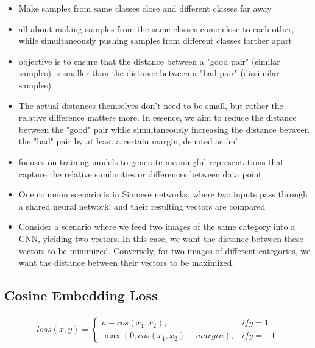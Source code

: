 \documentclass[11pt]{article}
\begin{document}
\begin{itemize}
    \item Make samples from same classes close and different classes far away
    \item all about making samples from the same classes
    come close to each other, while simultaneously pushing samples from different
    classes farther apart
    \item objective is to ensure that the distance between a
    "good pair" (similar samples) is smaller than the distance between a "bad pair"
    (dissimilar samples).
    \item The actual
    distances themselves don't need to be small, but rather the relative difference
    matters more. In essence, we aim to reduce the distance between the "good" pair
    while simultaneously increasing the distance between the "bad" pair by at least a
    certain margin, denoted as 'm'
    \item  focuses on
    training models to generate meaningful representations that capture the relative
    similarities or differences between data point
    \item One common scenario is in
    Siamese networks, where two inputs pass through a shared neural network, and
    their resulting vectors are compared
    \item Consider a scenario where we feed two images of the same category into a CNN,
    yielding two vectors. In this case, we want the distance between these vectors to
    be minimized. Conversely, for two images of different categories, we want the
    distance between their vectors to be maximized.
\end{itemize}

\subsection{Cosine Embedding Loss}

\begin{definition}\label{eq:cosine-embedding-loss}
    \begin{align*}
        loss(x,y)=\begin{cases}a - cos(x_1, x_2), & if y = 1 \\ \max(0,cos(x_1,x_2)- margin), & if y = -1 \end{cases}
    \end{align*}
\end{definition}
\end{document}
